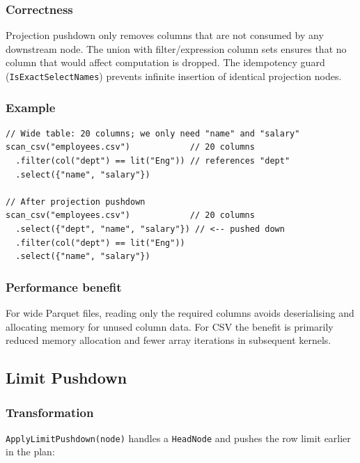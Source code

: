 \documentclass[12pt,a4paper]{article}
\begin{document}
\subsubsection*{Correctness}

Projection pushdown only removes columns that are not consumed by any
downstream node.  The union with filter/expression column sets ensures that
no column that would affect computation is dropped.  The idempotency guard
(\texttt{IsExactSelectNames}) prevents infinite insertion of identical
projection nodes.

\subsubsection*{Example}

\begin{lstlisting}
// Wide table: 20 columns; we only need "name" and "salary"
scan_csv("employees.csv")            // 20 columns
  .filter(col("dept") == lit("Eng")) // references "dept"
  .select({"name", "salary"})

// After projection pushdown
scan_csv("employees.csv")            // 20 columns
  .select({"dept", "name", "salary"}) // <-- pushed down
  .filter(col("dept") == lit("Eng"))
  .select({"name", "salary"})
\end{lstlisting}

\subsubsection*{Performance benefit}

For wide Parquet files, reading only the required columns avoids
deserialising and allocating memory for unused column data.  For CSV the
benefit is primarily reduced memory allocation and fewer array iterations
in subsequent kernels.

\subsection{Limit Pushdown}

\subsubsection*{Transformation}

\texttt{ApplyLimitPushdown(node)} handles a \texttt{HeadNode} and pushes
the row limit earlier in the plan:
\end{document}
